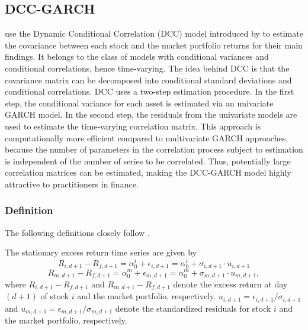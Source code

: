 \documentclass[11pt,a4paper]{article}
\begin{document}
\subsection{DCC-GARCH}

 use the Dynamic Conditional Correlation (DCC) model introduced by  to estimate the covariance between each stock and the market portfolio returns for their main findings. It belongs to the class of models with conditional variances and conditional correlations, hence time-varying. The idea behind DCC is that the covariance matrix can be decomposed into conditional standard deviations and conditional correlations. DCC uses a two-step estimation procedure. In the first step, the conditional variance for each asset is estimated via an univariate GARCH model. In the second step, the residuals from the univariate models are used to estimate the time-varying correlation matrix. This approach is computationally more efficient compared to multivariate GARCH approaches, because the number of parameters in the correlation process subject to estimation is independent of the number of series to be correlated. Thus, potentially large correlation matrices can be estimated, making the DCC-GARCH model highly attractive to practitioners in finance.



\subsubsection{Definition}

The following definitions closely follow .

The stationary excess return time series are given by
\begin{equation}
    R_{i,d+1} - R_{f,d+1} = \alpha_0^i + \epsilon_{i,d+1} = \alpha_0^i + \sigma_{i,d+1} \cdot u_{i,d+1}
\end{equation}
\begin{equation}
    R_{m,d+1} - R_{f,d+1} = \alpha_0^m + \epsilon_{m,d+1} = \alpha_0^m + \sigma_{m,d+1} \cdot u_{m,d+1},
\end{equation}
where $R_{i,d+1} - R_{f,d+1}$ and $R_{m,d+1} - R_{f,d+1}$ denote the excess return at day $(d+1)$ of stock $i$ and the market portfolio, respectively. $u_{i,d+1} = \epsilon_{i,d+1} / \sigma_{i,d+1}$ and $u_{m,d+1} = \epsilon_{m,d+1} / \sigma_{m,d+1}$ denote the standardized residuals for stock $i$ and the market portfolio, respectively.
\end{document}
